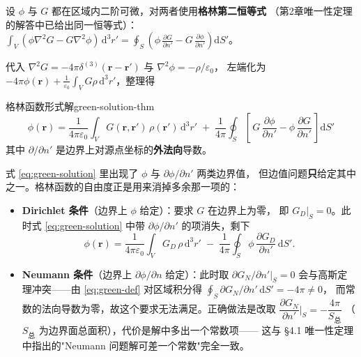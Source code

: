 \documentclass[11pt,a4paper,openany,oneside]{book}
\newcommand{\diff}{\mathrm{d}}
\newcommand{\eps}{\varepsilon}
\newcommand{\vect}[1]{\bm{#1}}
\newcommand{\lap}{\nabla^2}
\begin{document}
设 $\phi$ 与 $G$ 都在区域内二阶可微，对两者使用\textbf{格林第二恒等式}
（第2章唯一性定理的解答中已给出同一恒等式）：
$\displaystyle\int_V(\phi\lap G - G\lap\phi)\,\diff^3r'
= \oint_S\left(\phi\,\frac{\partial G}{\partial n'} - G\,\frac{\partial \phi}{\partial n'}\right)\diff S'$。

代入 $\lap G = -4\pi\delta^{(3)}(\vect r - \vect r')$ 与 $\lap\phi = -\rho/\eps_0$，
左端化为 $-4\pi\phi(\vect r) + \frac{1}{\eps_0}\int_V G\rho\,\diff^3r'$，整理得

\begin{theorem}{格林函数形式解}{green-solution-thm}
\begin{equation}
\phi(\vect r) = \frac{1}{4\pi\eps_0}\int_V G(\vect r,\vect r')\,\rho(\vect r')\,\diff^3r'
\;+\; \frac{1}{4\pi}\oint_S\left[\,
G\,\frac{\partial\phi}{\partial n'} - \phi\,\frac{\partial G}{\partial n'}
\,\right]\diff S'
\label{eq:green-solution}
\end{equation}
其中 $\partial/\partial n'$ 是边界上对源点坐标的\textbf{外法向}导数。
\end{theorem}

式 \eqref{eq:green-solution} 里出现了 $\phi$ 与 $\partial\phi/\partial n'$ 两类边界值，
但边值问题\textbf{只}给定其中之一。格林函数的自由度正是用来消掉多余那一项的：

\begin{itemize}
\item \textbf{Dirichlet 条件}（边界上 $\phi$ 给定）：要求 $G$ 在边界上为零，
  即 $G_D\big|_S = 0$。此时式 \eqref{eq:green-solution} 中带 $\partial\phi/\partial n'$
  的项消失，剩下
  \begin{equation}
  \phi(\vect r) = \frac{1}{4\pi\eps_0}\int_V G_D\,\rho\,\diff^3r'
  \;-\; \frac{1}{4\pi}\oint_S \phi\,\frac{\partial G_D}{\partial n'}\,\diff S'.
  \label{eq:green-dirichlet}
  \end{equation}
\item \textbf{Neumann 条件}（边界上 $\partial\phi/\partial n$ 给定）：此时取
  $\partial G_N/\partial n'\big|_S = 0$ 会与高斯定理冲突——由 \eqref{eq:green-def}
  对区域积分得 $\oint_S \partial G_N/\partial n'\,\diff S' = -4\pi \neq 0$，
  而常数的法向导数为零，故这个要求无法满足。正确做法是改取
  $\dfrac{\partial G_N}{\partial n'}\bigg|_S = -\dfrac{4\pi}{S_{\text{总}}}$
  （$S_{\text{总}}$ 为边界面总面积），代价是解中多出一个常数项——
  这与 §4.1 唯一性定理中指出的"Neumann 问题解可差一个常数"完全一致。
\end{itemize}
\end{document}
